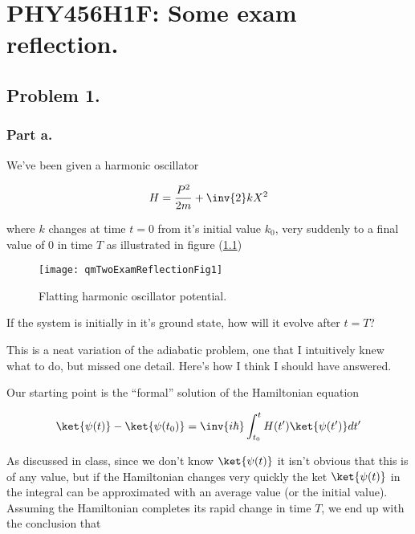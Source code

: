 
%

\chapter{PHY456H1F: Some exam reflection.}
\label{chap:qmTwoExamReflection}
{}
\date{Dec 13, 2011}

\beginArtWithToc

\section{Problem 1.}
\subsection{Part a.}

We've been given a harmonic oscillator

\begin{equation}\label{eqn:qmTwoExamReflection:10}
H = \frac{P^2}{2m} + \inv{2} k X^2
\end{equation}

where $k$ changes at time $t=0$ from it's initial value $k_0$, very suddenly to a final value of $0$ in time $T$ as illustrated in figure (\ref{fig:qmTwoExamReflection:qmTwoExamReflectionFig1})
\begin{figure}[htp]
   \centering
   \texttt{[image: qmTwoExamReflectionFig1]}
   \caption{Flatting harmonic oscillator potential.}\label{fig:qmTwoExamReflection:qmTwoExamReflectionFig1}
\end{figure}

If the system is initially in it's ground state, how will it evolve after $t = T$?

This is a neat variation of the adiabatic problem, one that I intuitively knew what to do, but missed one detail.  Here's how I think I should have answered.

Our starting point is the ``formal'' solution of the Hamiltonian equation

\begin{equation}\label{eqn:qmTwoExamReflection:30}
\ket{\psi(t)} - \ket{\psi(t_0)} = \inv{i\hbar} \int_{t_0}^t H(t') \ket{\psi(t')} dt'
\end{equation}

As discussed in class, since we don't know $\ket{\psi(t)}$ it isn't obvious that this is of any value, but if the Hamiltonian changes very quickly the ket $\ket{\psi(t)}$ in the integral can be approximated with an average value (or the initial value).  Assuming the Hamiltonian completes its rapid change in time $T$, we end up with the conclusion that

